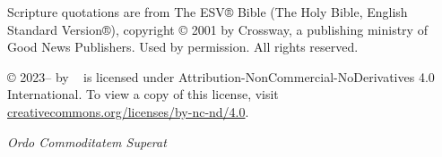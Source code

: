 \documentclass{dspbook}
\begin{document}
\vspace{0.5cm}
{
\footnotesize\noindent
\begin{sloppypar}\noindent
Scripture quotations are from The ESV® Bible (The Holy Bible, English Standard Version®),
copyright © 2001 by Crossway, a publishing ministry of Good News Publishers. Used by
permission. All rights reserved.
\end{sloppypar}
}

\vspace{0.5cm}
{
\footnotesize\noindent
\begin{sloppypar}\noindent
\thetitle{} © 2023--\the\year{} by \theauthor{}~ is licensed under
Attribution-NonCommercial-NoDerivatives 4.0 International. To view a copy of this license,
visit
\href{http://creativecommons.org/licenses/by-nc-nd/4.0/}{creativecommons.org/licenses/by-nc-nd/4.0}.
\end{sloppypar}
}

\cleardoublepage

\thispagestyle{empty}
\vspace*{\fill}
\begin{center}
  \textit{Ordo Commoditatem Superat}
\end{center}
\vfill

\cleardoublepage



\cleardoublepage



\cleardoublepage

\tableofcontents

\cleardoublepage

\mainmatter










\startappendices


% 

\backmatter

\printglossary

\printbibliography[heading=bibintoc]
\end{document}
